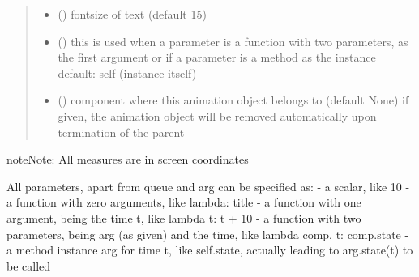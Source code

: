 \documentclass[letterpaper,10pt,english]{sphinxmanual}
\begin{document}
\begin{fulllineitems}
\begin{quote}
\begin{description}
\begin{itemize}
\item {} 
 () \textendash{} fontsize of text (default 15)

\item {} 
 () \textendash{} this is used when a parameter is a function with two parameters, as the first argument or
if a parameter is a method as the instance 
default: self (instance itself)

\item {} 
 ({\hyperref[\detokenize{Reference:salabim.Component}]{}}) \textendash{} component where this animation object belongs to (default None) 
if given, the animation object will be removed
automatically upon termination of the parent

\end{itemize}

\end{description}\end{quote}

\begin{sphinxadmonition}{note}{Note:}
All measures are in screen coordinates 

All parameters, apart from queue and arg can be specified as: 
- a scalar, like 10 
- a function with zero arguments, like lambda: title 
- a function with one argument, being the time t, like lambda t: t + 10 
- a function with two parameters, being arg (as given) and the time, like lambda comp, t: comp.state 
- a method instance arg for time t, like self.state, actually leading to arg.state(t) to be called
\end{sphinxadmonition}

\end{fulllineitems}

\end{document}
